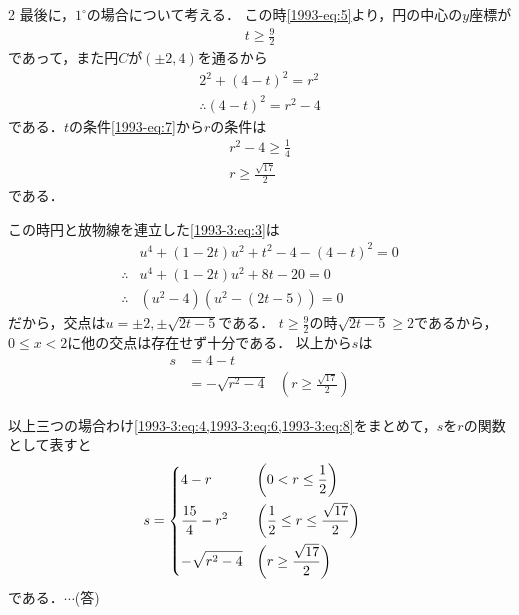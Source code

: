 \documentclass[../../../../main.tex]{subfiles}
\begin{document}
\begin{multicols}{2}
  \vspace{10pt}
  最後に，$1^{\circ}$の場合について考える．
  この時\cref{1993-eq:5}より，円の中心の$y$座標が
  \begin{align}
    t \ge \frac{9}{2} \label{1993-eq:7}
  \end{align}
  であって，また円$C$が$(\pm2, 4)$を通るから
  \begin{align*}
    2^2 + (4-t)^2 = r^2 \\
    \therefore
    (4-t)^2 = r^2 -4
  \end{align*}
  である．$t$の条件\cref{1993-eq:7}から$r$の条件は
  \begin{align*}
    r^2 -4 \ge \frac{1}{4} \\
    r \ge \frac{\sqrt{17}}{2}
  \end{align*}
  である．

  この時円と放物線を連立した\cref{1993-3:eq:3}は
  \begin{align*}
     & u^4 + (1-2t)u^2 + t^2 -4 - (4-t)^2 = 0 \\
    \therefore
     & u^4 + (1-2t)u^2 + 8t -20 = 0           \\
    \therefore
     & (u^2-4)\left(u^2 - (2t-5)\right) = 0
  \end{align*}
  だから，交点は$u=\pm 2, \pm\sqrt{2t-5}$である．
  $t \ge \frac{9}{2}$の時$\sqrt{2t-5}\ge 2$であるから，$0\le x <2$に他の交点は存在せず十分である．
  以上から$s$は
  \begin{align}
    s
     & = 4 - t                                                                      \\
     & = - \sqrt{r^2-4} & \left(r \ge \frac{\sqrt{17}}{2} \right) \label{1993-eq:8}
  \end{align}

  以上三つの場合わけ\cref{1993-3:eq:4,1993-3:eq:6,1993-3:eq:8}をまとめて，$s$を$r$の関数として表すと
  \begin{align*}
    s & =
    \begin{dcases}
      4 - r              & \left(0 < r \le \frac{1}{2}\right)                       \\
      \frac{15}{4} - r^2 & \left(\frac{1}{2} \le  r  \le \frac{\sqrt{17}}{2}\right) \\
      - \sqrt{r^2-4}     & \left(r \ge \frac{\sqrt{17}}{2} \right)
    \end{dcases}
  \end{align*}
  である．$\cdots$(答)

  \vspace{10pt}


\end{multicols}
\end{document}
